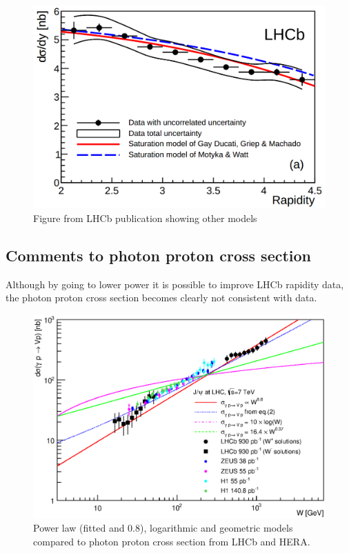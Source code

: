 \documentclass[12pt]{article}
\begin{document}
\begin{figure}[!h]
\centering
 \includegraphics[width=.8\textwidth]{figures/Magno.png}
 \caption{Figure from LHCb publication showing other models}
\end{figure}


\clearpage
\subsection{Comments to photon proton cross section}
Although by going to lower power it is possible to improve LHCb rapidity data, the photon proton cross section becomes clearly not consistent with data.
\begin{figure}[!h]
\centering
 \includegraphics[width=.8\textwidth]{figures/sigma_gamma_p_W_all_theory.eps}
 \caption{Power law (fitted and 0.8), logarithmic and geometric models compared to photon proton cross section from LHCb and HERA.}
\end{figure}
\end{document}
